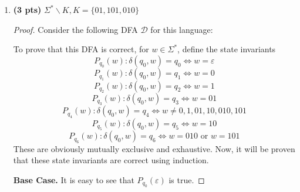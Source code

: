 \documentclass[11pt]{article}
\begin{document}
\begin{enumerate}[label=\textbf{Q\arabic*.}]
\begin{enumerate}[label=\textit{\alph*)}]
\begin{proof}
		A string that is not in \(\Sigma ^*\) cannot be found so the backwards direction is vacuously true.

		Therefore \(\mathcal{D}\) is correct.
		\smallbreak
	\end{proof}

	\item \textbf{(3 pts)} $ \Sigma^*\backslash K, K =\{01, 101, 010\}$
	
	\begin{proof}
		Consider the following DFA \(\mathcal{D}\) for this language:
		\begin{center}
		\end{center}
		To prove that this DFA is correct, for \(w \in \Sigma ^*\), define the state invariants
		\[
			P_{q_0}(w) : \delta (q_0, w) = q_0 \iff w = \varepsilon
		\]
		\[
			P_{q_1}(w) : \delta (q_0, w) = q_1 \iff w = 0
		\]
		\[
			P_{q_2}(w) : \delta (q_0, w) = q_2 \iff w = 1
		\]
		\[
			P_{q_3}(w) : \delta (q_0, w) = q_3 \iff w = 01
		\]
		\[
			P_{q_4}(w) : \delta (q_0, w) = q_4 \iff w \neq 0,1,01,10,010,101
		\]
		\[
			P_{q_5}(w) : \delta (q_0, w) = q_5 \iff w = 10
		\]
		\[
			P_{q_6}(w) : \delta (q_0, w) = q_6 \iff w = 010 \text{ or } w = 101
		\]
		These are obviously mutually exclusive and exhaustive. Now, it will be proven that these state invariants are correct using induction.

		\medskip

		\textbf{Base Case.} It is easy to see that \(P_{q_0}(\varepsilon)\) is true.

		\medskip


\end{proof}
\end{enumerate}
\end{enumerate}
\end{document}
